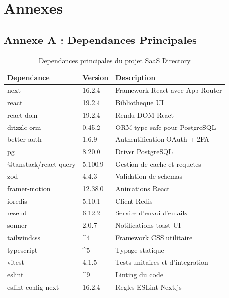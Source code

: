 \section*{Annexes}

\subsection*{Annexe A : Dependances Principales}

\begin{table}[H]
\centering
\caption{Dependances principales du projet SaaS Directory}
\label{tab:deps}
\begin{tabular}{@{}lll@{}}
\toprule
\textbf{Dependance} & \textbf{Version} & \textbf{Description} \\
\midrule
next & 16.2.4 & Framework React avec App Router \\
react & 19.2.4 & Bibliotheque UI \\
react-dom & 19.2.4 & Rendu DOM React \\
drizzle-orm & 0.45.2 & ORM type-safe pour PostgreSQL \\
better-auth & 1.6.9 & Authentification OAuth + 2FA \\
pg & 8.20.0 & Driver PostgreSQL \\
@tanstack/react-query & 5.100.9 & Gestion de cache et requetes \\
zod & 4.4.3 & Validation de schemas \\
framer-motion & 12.38.0 & Animations React \\
ioredis & 5.10.1 & Client Redis \\
resend & 6.12.2 & Service d'envoi d'emails \\
sonner & 2.0.7 & Notifications toast UI \\
tailwindcss & \^{}4 & Framework CSS utilitaire \\
typescript & \^{}5 & Typage statique \\
vitest & 4.1.5 & Tests unitaires et d'integration \\
eslint & \^{}9 & Linting du code \\
eslint-config-next & 16.2.4 & Regles ESLint Next.js \\
\bottomrule
\end{tabular}
\end{table}

\newpage

